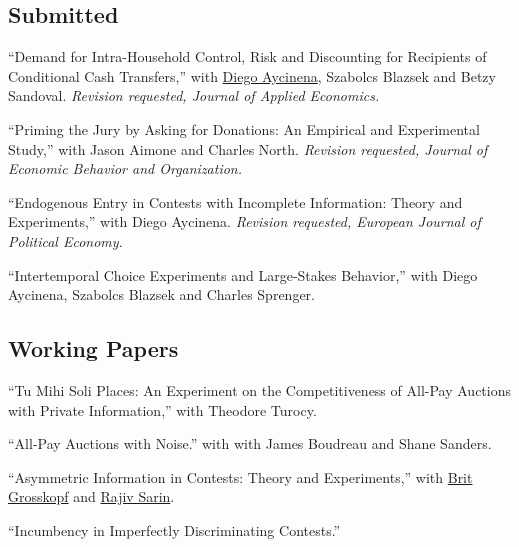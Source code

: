 \documentclass{article}%
\renewenvironment{itemize}{
\begin{list}{}{
\setlength{\leftmargin}{1.5em}
}
}{
\end{list}
}
\begin{document}
\subsection*{Submitted}
\begin{itemize}


\item ``Demand for Intra-Household Control, Risk and Discounting for Recipients of Conditional Cash Transfers,'' with \href{www.diegoaycinena.com}{Diego Aycinena}, Szabolcs Blazsek and Betzy Sandoval. \textit{Revision requested, Journal of Applied Economics.}

\item ``Priming the Jury by Asking for Donations: An Empirical and Experimental Study,'' with Jason Aimone and Charles North. \textit{Revision requested, Journal of Economic Behavior and Organization.}

\item ``Endogenous Entry in Contests with Incomplete Information: Theory and Experiments,'' with Diego Aycinena. \textit{Revision requested, European Journal of Political Economy.}

\item ``Intertemporal Choice Experiments and Large-Stakes Behavior,'' with Diego Aycinena, Szabolcs Blazsek and Charles Sprenger.

\end{itemize}



\subsection*{Working Papers}
\begin{itemize}
\item ``Tu Mihi Soli Places: An Experiment on the Competitiveness of All-Pay Auctions with Private Information,'' with Theodore Turocy.

\item ``All-Pay Auctions with Noise.'' with with James Boudreau and Shane Sanders. 

\item ``Asymmetric Information in Contests: Theory and
Experiments,'' with \href{http://www.bgrosskopf.com}{Brit
Grosskopf} and \href{http://econweb.tamu.edu/rsarin}{Rajiv Sarin}.

\item ``Incumbency in Imperfectly Discriminating
Contests.'' \\ \hspace*{1cm}

\end{itemize}
\end{document}
